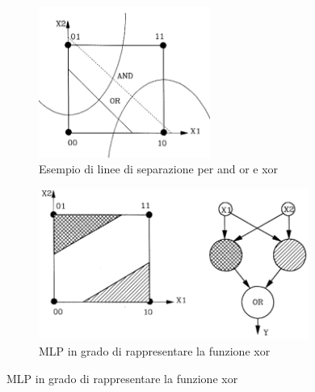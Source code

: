\documentclass[10pt,a4paper]{article}
\begin{document}
\begin{figure}[h!]
  \centering
  \begin{subfigure}[t]{0.45\linewidth}
  	\centering
    \includegraphics[height=140pt]{SepXor.png}
    \captionsetup{justification=centering}
    \vspace{10pt}
    \caption*{Esempio di linee di separazione per and or e xor}
  \end{subfigure}
  \begin{subfigure}[t]{0.45\linewidth}
    \vspace{-130pt}
  	\centering
    \includegraphics[height=140pt]{MLPxor.png}
    \captionsetup{justification=centering}
    \caption*{MLP in grado di rappresentare la funzione xor}
  \end{subfigure}
  \label{fig:graph6}
\end{figure}
%
\end{document}
